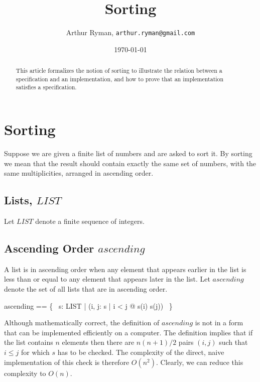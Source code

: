\documentclass[11pt, oneside]{article}
\title{Sorting}
\author{Arthur Ryman, {\tt arthur.ryman@gmail.com}}
\date{\today}
\begin{document}
\maketitle

\begin{abstract}
This article formalizes the notion of sorting to illustrate the relation between
a specification and an implementation, and how to prove that an implementation satisfies
a specification.
\end{abstract}

\section{Sorting}

Suppose we are given a finite list of numbers and are asked to sort it.
By sorting we mean that the result should contain exactly the same set of numbers, with the same multiplicities,
arranged in ascending order.

\subsection{Lists, $LIST$}

Let $LIST$ denote a finite sequence of integers.


\subsection{Ascending Order $ascending$}

A list is in ascending order when any element that appears earlier in the list is less than
or equal to any element that appears later in the list.
Let $ascending$ denote the set of all lists that are in ascending order.

\begin{zed}
ascending == \{~ s: LIST | (\forall i, j: \dom s | i < j @ s(i) \leq s(j)) ~\}
\end{zed}

Although mathematically correct, the definition of $ascending$ is not in a 
form that can be implemented efficiently on a computer.
The definition implies that if the list contains $n$ elements then
there are $n(n+1)/2$ pairs $(i, j)$ such that $i \leq j$ for which $s$ has to be checked.
The complexity of the direct, naive implementation of this check is therefore $O(n^2)$.
Clearly, we can reduce this complexity to $O(n)$.
\end{document}
